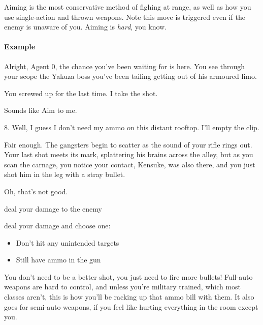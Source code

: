 Aiming is the most conservative method of fighing at range, as well as
how you use single-action and thrown weapons. Note this move is
triggered even if the enemy is unaware of you. Aiming is \emph{hard},
you know.

\paragraph{Example}
\begin{dialogue}
   Alright, Agent 0, the chance you've been waiting for is
  here. You see through your scope the Yakuza boss you've been tailing
  getting out of his armoured limo.

   You screwed up for the last time. I take the shot.

   Sounds like Aim to me.

   8. Well, I guess I don't need my ammo on this
  distant rooftop. I'll empty the clip.

   Fair enough. The gangsters begin to scatter as the sound
  of your rifle rings out. Your last shot meets its mark, splattering
  his brains across the alley, but as you scan the carnage, you notice
  your contact, Kensuke, was also there, and you just shot him in the
  leg with a stray bullet.

   Oh, that's not good.
\end{dialogue}


{deal your damage to the enemy}
{deal your damage and choose one:
\begin{itemize}
\item Don't hit any unintended targets
\item Still have ammo in the gun
\end{itemize}}

You don't need to be a better shot, you just need to fire more
bullets! Full-auto weapons are hard to control, and unless you're
military trained, which most classes aren't, this is how you'll be
racking up that ammo bill with them. It also goes for semi-auto
weapons, if you feel like hurting everything in the room except you.

